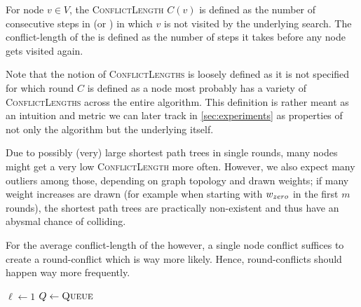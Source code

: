 \begin{definition}\label{def:conflict_len}
    For node $v \in V$, the \textsc{ConflictLength} $C(v)$ is defined as the number of consecutive steps in \algbp (or \algsp) in which $v$ is not visited by the underlying search.
    The conflict-length of the \markov is defined as the number of steps it takes before any node gets visited again.
\end{definition}
Note that the notion of \textsc{ConflictLengths} is loosely defined as it is not specified for which round $C$ is defined as a node most probably has a variety of \textsc{ConflictLengths} across the entire algorithm.
This definition is rather meant as an intuition and metric we can later track in \cref{sec:experiments} as properties of not only the algorithm but the underlying \markov itself.

Due to possibly (very) large shortest path trees in single rounds, many nodes might get a very low \textsc{ConflictLength} more often.
However, we also expect many outliers among those, depending on graph topology and drawn weights; if many weight increases are drawn (for example when starting with $w_{zero}$ in the first $m$ rounds), the shortest path trees are practically non-existent and thus have an abysmal chance of colliding.

For the average conflict-length of the \markov however, a single node conflict suffices to create a round-conflict which is way more likely.
Hence, round-conflicts should happen way more frequently.

\medskip

\begin{algorithm}[!htb]
  \caption{
    \algbt
  }
  \label{algo:batching}


  \BlankLine
  $\ell \gets 1$\;
  $Q \gets \textsc{Queue}$\;

\end{algorithm}


